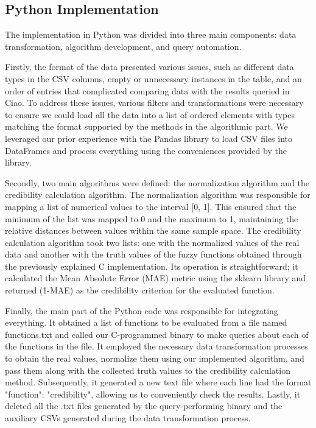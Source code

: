 \documentclass[fleqn,11pt]{article}
\begin{document}
\subsection{Python Implementation}

The implementation in Python was divided into three main components: data transformation, algorithm development, and query automation.

Firstly, the format of the data presented various issues, such as different data types in the CSV columns, empty or unnecessary instances in the table, and an order of entries that complicated comparing data with the results queried in Ciao. To address these issues, various filters and transformations were necessary to ensure we could load all the data into a list of ordered elements with types matching the format supported by the methods in the algorithmic part. We leveraged our prior experience with the Pandas library to load CSV files into DataFrames and process everything using the conveniences provided by the library.

Secondly, two main algorithms were defined: the normalization algorithm and the credibility calculation algorithm. The normalization algorithm was responsible for mapping a list of numerical values to the interval [0, 1]. This ensured that the minimum of the list was mapped to 0 and the maximum to 1, maintaining the relative distances between values within the same sample space. The credibility calculation algorithm took two lists: one with the normalized values of the real data and another with the truth values of the fuzzy functions obtained through the previously explained C implementation. Its operation is straightforward; it calculated the Mean Absolute Error (MAE) metric using the sklearn library and returned (1-MAE) as the credibility criterion for the evaluated function.

Finally, the main part of the Python code was responsible for integrating everything. It obtained a list of functions to be evaluated from a file named functions.txt and called our C-programmed binary to make queries about each of the functions in the file. It employed the necessary data transformation processes to obtain the real values, normalize them using our implemented algorithm, and pass them along with the collected truth values to the credibility calculation method. Subsequently, it generated a new text file where each line had the format "function": "credibility", allowing us to conveniently check the results. Lastly, it deleted all the .txt files generated by the query-performing binary and the auxiliary CSVs generated during the data transformation process.
\end{document}
